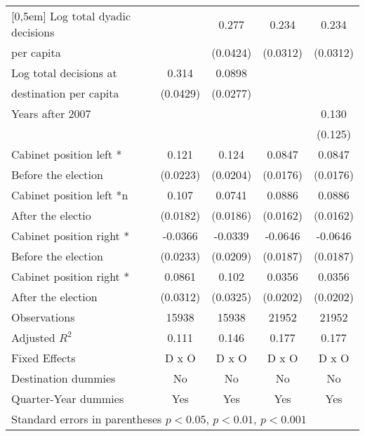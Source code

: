 \begin{table}[htbp]
\begin{tabular}{l*{4}{c}}
[0,5em]
Log total dyadic decisions&                     &       0.277\sym{***}&       0.234\sym{***}&       0.234\sym{***}\\
per capita                    &                     &    (0.0424)         &    (0.0312)         &    (0.0312)         \\
[0,5em]
Log total decisions at &       0.314\sym{***}&      0.0898\sym{**} &                     &                     \\
 destination per capita                    &    (0.0429)         &    (0.0277)         &                     &                     \\
[0,5em]
Years after 2007    &                     &                     &                     &       0.130         \\
                    &                     &                     &                     &     (0.125)         \\
[0,5em]
Cabinet position left *&       0.121\sym{***}&       0.124\sym{***}&      0.0847\sym{***}&      0.0847\sym{***}\\
 Before the election                    &    (0.0223)         &    (0.0204)         &    (0.0176)         &    (0.0176)         \\
[0,5em]
Cabinet position left *n&       0.107\sym{***}&      0.0741\sym{***}&      0.0886\sym{***}&      0.0886\sym{***}\\
 After the electio                    &    (0.0182)         &    (0.0186)         &    (0.0162)         &    (0.0162)         \\
[0,5em]
Cabinet position right *&     -0.0366         &     -0.0339         &     -0.0646\sym{**} &     -0.0646\sym{**} \\
 Before the election                    &    (0.0233)         &    (0.0209)         &    (0.0187)         &    (0.0187)         \\
[0,5em]
Cabinet position right * &      0.0861\sym{**} &       0.102\sym{**} &      0.0356         &      0.0356         \\
 After the election                   &    (0.0312)         &    (0.0325)         &    (0.0202)         &    (0.0202)         \\
\hline
Observations        &       15938         &       15938         &       21952         &       21952         \\
Adjusted \(R^{2}\)  &       0.111         &       0.146         &       0.177         &       0.177         \\
Fixed Effects       &       D x O         &       D x O         &       D x O         &       D x O         \\
Destination dummies &          No         &          No         &          No         &          No         \\
Quarter-Year dummies&         Yes         &         Yes         &         Yes         &         Yes         \\
\hline\hline
\multicolumn{5}{l}{ Standard errors in parentheses \sym{*} \(p<0.05\), \sym{**} \(p<0.01\), \sym{***} \(p<0.001\)}\\
\end{tabular}
\end{table}
